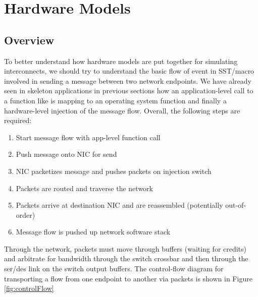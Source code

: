 
\newcommand{\nodecls}{\inlinecode{node}\xspace}
\newcommand{\topcls}{\inlinecode{topology}\xspace}
\newcommand{\switchid}{\inlinecode{switch_id}\xspace}
\newcommand{\nodeid}{\inlinecode{node_id}\xspace}

\chapter{Hardware Models}
\label{chapter:hardware}

\section{Overview}
To better understand how hardware models are put together for simulating interconnects, we should try to understand the basic flow of event in SST/macro involved in sending a message between two network endpoints.  We have already seen in skeleton applications in previous sections how an application-level call to a function like  is mapping to an operating system function and finally a hardware-level injection of the message flow.  Overall, the following steps are required:

\begin{enumerate}
\item Start message flow with app-level function call
\item Push message onto NIC for send
\item NIC packetizes message and pushes packets on injection switch
\item Packets are routed and traverse the network
\item Packets arrive at destination NIC and are reassembled (potentially out-of-order)
\item Message flow is pushed up network software stack
\end{enumerate}

Through the network, packets must move through buffers (waiting for credits) and arbitrate for bandwidth through the switch crossbar and then through the ser/des link on the switch output buffers.  The control-flow diagram for transporting a flow from one endpoint to another via packets is shown in Figure \ref{fig:controlFlow}

